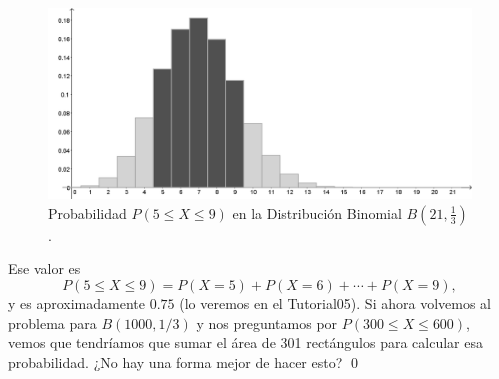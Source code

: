 \begin{ejemplo}
\begin{figure}[ht]
\begin{center}
\begin{enColor}
\end{enColor}
\begin{bn}
\includegraphics[width=12cm]{../fig/Cap05-HistogramaBinomial05-bn.png}
\end{bn}
\caption{Probabilidad $P(5\leq X\leq 9)$ en la Distribución Binomial $B\left(21,\frac{1}{3}\right)$.}
\label{cap05:fig:HistogramaBinomial05}
\end{center}
\end{figure}
Ese valor es
\[P(5\leq X\leq 9)=P(X=5)+P(X=6)+\cdots+P(X=9),\]
y es aproximadamente $0.75$ (lo veremos en el Tutorial05). Si ahora volvemos al problema para $B(1000,1/3)$  y nos preguntamos por $P(300\leq X\leq 600)$, vemos que tendríamos que sumar el área de 301 rectángulos para calcular esa probabilidad. ¿No hay una forma mejor de hacer esto?
\qed
\end{ejemplo}

